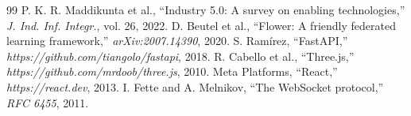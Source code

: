 \documentclass[letterpaper, 10 pt, conference]{ieeeconf}
\begin{document}
\begin{thebibliography}{99}
 P. K. R. Maddikunta et al., ``Industry 5.0: A survey on enabling technologies,'' \emph{J. Ind. Inf. Integr.}, vol. 26, 2022.
 D. Beutel et al., ``Flower: A friendly federated learning framework,'' \emph{arXiv:2007.14390}, 2020.
 S. Ramírez, ``FastAPI,'' \emph{https://github.com/tiangolo/fastapi}, 2018.
 R. Cabello et al., ``Three.js,'' \emph{https://github.com/mrdoob/three.js}, 2010.
 Meta Platforms, ``React,'' \emph{https://react.dev}, 2013.
 I. Fette and A. Melnikov, ``The WebSocket protocol,'' \emph{RFC 6455}, 2011.
\end{thebibliography}
\end{document}
